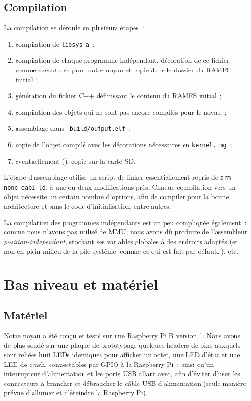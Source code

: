 \documentclass[11pt,a4paper]{article}
\newcommand{\fname}[1]{\texttt{#1}} %
\begin{document}
\subsection{Compilation}
La compilation se déroule en plusieurs étapes~:
\begin{enumerate}
	\item compilation de \fname{libsys.a}~;
	\item compilation de chaque programme indépendant, décoration de ce
		fichier comme exécutable pour notre noyau et copie dans le
		dossier du RAMFS initial~;
	\item génération du fichier C++ définissant le contenu du RAMFS initial~;
	\item compilation des objets qui ne sont pas encore compilés pour le
		noyau~;
	\item assemblage dans \fname{\_build/output.elf}~;
	\item copie de l'objet compilé avec les décorations nécessaires en
		\fname{kernel.img}~;
	\item éventuellement (), copie sur la carte SD\@.
\end{enumerate}

L'étape d'assemblage utilise un script de linker essentiellement repris de
\fname{arm-none-eabi-ld}, à une ou deux modifications près. Chaque
compilation vers un objet nécessite un certain nombre d'options, afin de
compiler pour la bonne architecture et sans le code d'initialisation, entre
autres.

La compilation des programmes indépendants est un peu compliquée également~:
comme nous n'avons pas utilisé de MMU, nous avons dû produire de l'assembleur
\textit{position-independant}, stockant ses variables globales à des endroits
adaptés (et non en plein milieu de la pile système, comme ce qui est fait
par défaut\ldots), etc.

\section{Bas niveau et matériel}

\subsection{Matériel}
Notre noyau a été conçu et testé sur une 
\href{https://www.raspberrypi.org/products/model-b/}{Raspberry Pi B version 1}.
Nous avons de plus soudé sur une plaque de prototypage quelques headers de
pins auxquels sont reliées huit LEDs identiques pour afficher un octet,
une LED d'état et une LED de crash, connectables par GPIO à la Raspberry Pi~;
ainsi qu'un interrupteur d'alimentation et les ports USB allant avec, afin
d'éviter d'user les connecteurs à brancher et débrancher le câble USB
d'alimentation (seule manière prévue d'allumer et d'éteindre la Raspberry Pi).
\end{document}
